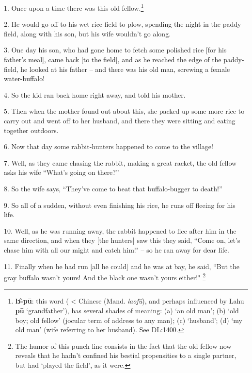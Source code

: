 \setcounter{footnote}{0}

1. Once upon a time there was this old fellow.\footnote{\textbf{lɔ̂-pū}: this word ( < Chinese  (Mand. \textit{laofū}), and perhaps influenced by Lahu \textbf{pū} `grandfather'), has several shades of meaning: (a) `an old man'; (b) `old boy; old fellow' (jocular term of address to any man); (c) `husband'; (d) `my old man' (wife referring to her husband). See DL:1400.}

2. He would go off to his wet-rice field to plow, spending the night in the paddy-field,
along with his son, but his wife wouldn't go along.

3. One day his son, who had gone home to fetch some polished rice [for his father's
meal], came back [to the field], and as he reached the edge of the paddy-field,
he looked at his father -- and there was his old man, screwing a female water-buffalo!

4. So the kid ran back home right away, and told his mother.

5. Then when the mother found out about this, she packed up some more rice to carry
out and went off to her husband, and there they were sitting and eating together
outdoors.

6. Now that day some rabbit-hunters happened to come to the village!

7. Well, as they came chasing the rabbit, making a great racket, the old fellow
asks his wife ``What's going on there?''

8. So the wife says, ``They've come to beat that buffalo-bugger to death!''

9. So all of a sudden, without even finishing his rice, he runs off fleeing for
his life.

10. Well, as he was running away, the rabbit happened to flee after him in the
same direction, and when they [the hunters] saw this they said, ``Come
on, let's chase him with all our might and catch him!" -- so he ran away
for dear life.

11. Finally when he had run [all he could] and he was at bay, he said, ``But
the gray buffalo wasn't yours! And the black one wasn't yours either!"
\footnote{The humor of this punch line consists in the fact that the old fellow now reveals that he hadn't confined his bestial propensities to a single partner, but had `played the field', as it were.}

